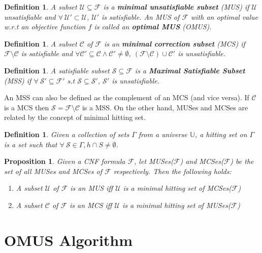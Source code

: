 \documentclass{article}
\newcommand\m[1]{\mathcal{#1}}
\newtheorem{definition}[thm]{Definition}
\newtheorem{proposition}[propo]{Proposition}
\begin{document}
\begin{definition}
  A subset $\m{U} \subseteq \m{F}$ is a \textbf{minimal unsatisfiable subset} (MUS) if $\m{U}$ \emph{unsatisfiable} and $\forall \ \m{U}' \subset \m{U}$, $\m{U}'$ is \emph{satisfiable}. An MUS of $\m{F}$ with an optimal value w.r.t an \emph{objective function $f$} is called an \textbf{optimal MUS} (OMUS).
\end{definition}

\begin{definition}
  A subset $\m{C}$ of $\m{F}$ is an \textbf{minimal correction subset} (MCS) if $\m{F}  \setminus \m{C}$ is \emph{satisfiable} and $\forall \m{C}' \subseteq \m{C} \wedge \m{C}' \neq \emptyset$, $(\m{F} \setminus \m{C}) \cup \m{C}'$ is \emph{unsatisfiable}.
\end{definition}

\begin{definition}
  A \emph{satisfiable subset} $\m{S} \subseteq \m{F}$ is a \textbf{Maximal Satisfiable Subset} (MSS) if  $\forall \ \m{S}' \subseteq \m{F}'$ s.t $ \m{S} \subseteq \m{S}'$, $\m{S}'$ is \emph{unsatisfiable}.
\end{definition}

An MSS can also be defined as the complement of an MCS (and vice versa). If $\m{C}$ is a MCS then $ \m{S} = \m{F} \setminus \m{C}$ is a MSS. On the other hand, MUSes and MCSes are related by the concept of minimal hitting set.

\begin{definition}
  Given a collection of sets $\Gamma$ from a universe $\mathbb{U}$, a hitting set on $\Gamma$ is a set such that $\forall \ \m{S} \in \Gamma, h \cap S \neq \emptyset$.
\end{definition}

\begin{proposition}\label{prop:duality_MCS_MUS}
  Given a CNF formula $\m{F}$, let MUSes($\m{F}$) and MCSes($\m{F}$) be the set of all MUSes and MCSes of $\m{F}$ respectively. Then the following holds:
  \begin{enumerate}
    \item A subset $\m{U}$ of $\m{F}$ is an MUS iff $\m{U}$ is a minimal hitting set of MCSes($\m{F}$)
    \item A subset $\m{C}$ of $\m{F}$ is an MCS iff $\m{U}$ is a minimal hitting set of MUSes($\m{F}$)
  \end{enumerate}
\end{proposition}

\section{OMUS Algorithm}
\end{document}

